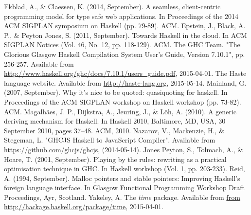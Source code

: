 \documentclass{sigplanconf}
\begin{document}
\begin{thebibliography}{}
  Ekblad, A., \& Claessen, K. (2014, September).
  A seamless, client-centric programming model for type safe web applications.
  In Proceedings of the 2014 ACM SIGPLAN symposium on Haskell (pp. 79-89). ACM.
  Epstein, J., Black, A. P., \& Peyton Jones, S. (2011, September).
  Towards Haskell in the cloud.
  In ACM SIGPLAN Notices (Vol. 46, No. 12, pp. 118-129). ACM.
  The GHC Team.
  "The Glorious Glasgow Haskell Compilation System User’s Guide, Version 7.10.1",
  pp. 256-257.
  Available from \url{http://www.haskell.org/ghc/docs/7.10.1/users_guide.pdf},
  2015-04-01.
  The Haste language website.
  Available from \url{http://haste-lang.org}, 2015-05-14.
  Mainland, G. (2007, September).
  Why it's nice to be quoted: quasiquoting for haskell.
  In Proceedings of the ACM SIGPLAN workshop on Haskell workshop (pp. 73-82).
  ACM.
  Magalhães, J. P., Dijkstra, A., Jeuring, J., \& Löh, A. (2010).
  A generic deriving mechanism for Haskell.
  In Haskell 2010, Baltimore, MD, USA, 30 September 2010, pages 37–48. ACM, 2010.
  Nazarov, V., Mackenzie, H., \& Stegeman, L.
  "GHCJS Haskell to JavaScript Compiler".
  Available from \url{https://github.com/ghcjs/ghcjs}, (2014-05-14).
  Jones Peyton, S., Tolmach, A., \& Hoare, T. (2001, September).
  Playing by the rules: rewriting as a practical optimisation technique in GHC.
  In Haskell workshop (Vol. 1, pp. 203-233).
  Reid, A. (1994, September).
  Malloc pointers and stable pointers: Improving Haskell's foreign language
  interface.
  In Glasgow Functional Programming Workshop Draft Proceedings, Ayr, Scotland.
  Yakeley, A.
  The \emph{time} package.
  Available from \url{from http://hackage.haskell.org/package/time}, 2015-04-01.

\end{thebibliography}
\end{document}
